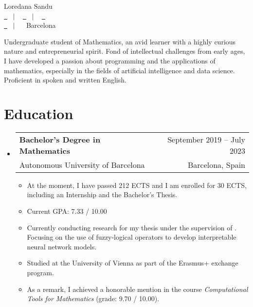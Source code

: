 \documentclass[a4paper,11pt]{article}
\makeatletter
\newcommand{\resumeQuadHeading}[4]{
  \item
  \begin{tabular*}{0.96\textwidth}[t]{l@{\extracolsep{\fill}}r}
    \textbf{#1} & \small #2 \\
    \small#3 & \small #4 \\
  \end{tabular*}
}
\newcommand{\resumeHeadingListStart}{
  \begin{itemize}[leftmargin=0.15in, label={}]
}
\newcommand{\resumeHeadingListEnd}{\end{itemize}}
\makeatother
\begin{document}
\begin{center}
    {\Huge Loredana Sandu \vspace{2pt}} \\[1.25pc]
    \href{https://loredanasandu.com}{\faLink \ } \ $|$ \ %
    \href{https://www.linkedin.com/in/loredana-sandu/}{\faLinkedinSquare \ } \ $|$ \ %
    \href{https://www.github.com/loredanasandu}{\faGithub \ } \\[0.1pc] %
    \href{mailto:loredana@loredanasandu.com}{\faEnvelope \ } \ $|$ \ %
    \faHome \ Barcelona \\[1.5pc] %
\end{center}

\begin{justify}
    Undergraduate student of Mathematics, an avid learner with a highly curious nature and entrepreneurial spirit. Fond of intellectual challenges from early ages, I have developed a passion about programming and the applications of mathematics, especially in the fields of artificial intelligence and data science. Proficient in spoken and written English.
\end{justify}



\section{Education}
    \resumeHeadingListStart{}
      \resumeQuadHeading{Bachelor's Degree in Mathematics}{September 2019 – July 2023}
      {Autonomous University of Barcelona}{Barcelona, Spain}
      \begin{itemize}[leftmargin=3em, itemsep=0.1em, topsep=2pt]
          \item \small At the moment, I have passed 212 ECTS and I am enrolled for 30 ECTS, including an Internship and the Bachelor's Thesis.
          \item \small Current GPA: 7.33 / 10.00
          \item \small Currently conducting research for my thesis under the supervision of \href{https://www.uab.cat/web/el-departament/pilar-dellunde-1260171823608.html}{}. Focusing on the use of fuzzy-logical operators to develop interpretable neural network models.
          \item \small Studied at the University of Vienna as part of the Erasmus+ exchange program.
          \item \small As a remark, I achieved a honorable mention in the course \textit{Computational Tools for Mathematics} (grade: 9.70 / 10.00). 
      \end{itemize}
    \resumeHeadingListEnd{}
\end{document}
